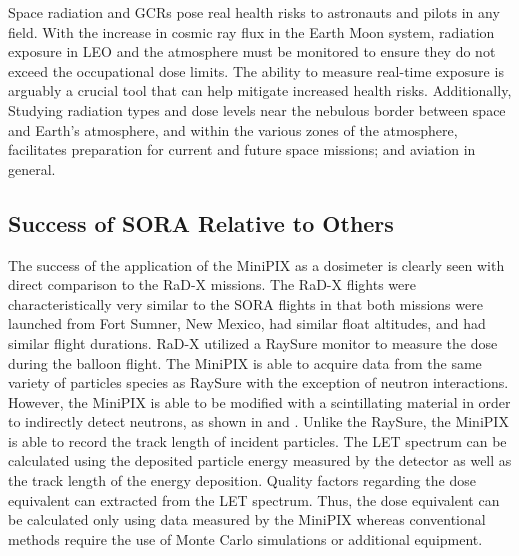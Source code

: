 Space radiation and GCRs pose real health risks to astronauts and pilots in any field.  With the increase in cosmic ray flux in the Earth Moon system, radiation exposure in LEO and the atmosphere must be monitored to ensure they do not exceed the occupational dose limits.  The ability to measure real-time exposure is arguably a crucial tool that can help mitigate increased health risks.  Additionally, Studying radiation types and dose levels near the nebulous border between space and Earth's atmosphere, and within the various zones of the atmosphere, facilitates preparation for current and future space missions; and aviation in general. 




\subsection{Success of SORA Relative to Others}

The success of the application of the MiniPIX as a dosimeter is clearly seen with direct comparison to the RaD-X missions. The RaD-X flights were characteristically very similar to the SORA flights in that both missions were launched from Fort Sumner, New Mexico, had similar float altitudes, and had similar flight durations. RaD-X utilized a RaySure monitor to measure the dose during the balloon flight. The MiniPIX is able to acquire data from the same variety of particles species as RaySure with the exception of neutron interactions. However, the MiniPIX is able to be modified with a scintillating material in order to indirectly detect neutrons, as shown in \cite{medipix-neutron-scintillator-1} and \cite{medipix-neutron-scintillator-2}. Unlike the RaySure, the MiniPIX is able to record the track length of incident particles. The LET spectrum can be calculated using the deposited particle energy measured by the detector as well as the track length of the energy deposition. Quality factors regarding the dose equivalent can extracted from the LET spectrum. Thus, the dose equivalent can be calculated only using data measured by the MiniPIX whereas conventional methods require the use of Monte Carlo simulations \cite{stuartthesis} or additional equipment.   

